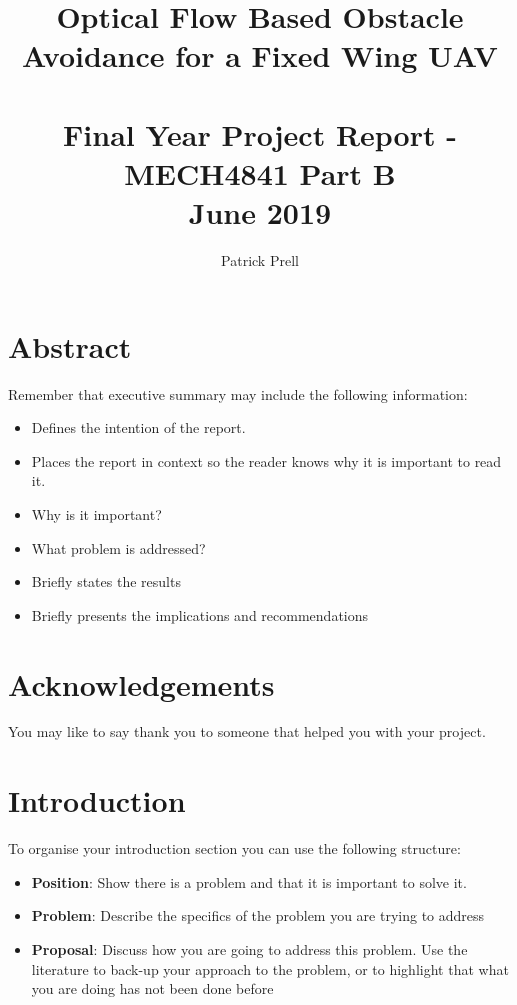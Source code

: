 \documentclass{UoNMCHA}
\numberwithin{equation}{section}
\begin{document}

\title{Optical Flow Based Obstacle Avoidance for a Fixed Wing UAV\\ \ \\
{\small Final Year Project Report - MECH4841 Part B  \\June 2019}}
\author[UoNMCHA]{Patrick Prell}
\address[UoNMCHA]{
Student of Mechatronics Engineering,\\
The University of Newcastle, Callaghan, NSW 2308, AUSTRALIA \\
Student Number: 3204734 \\
E-mail: \href{mailto:Patrick.Prell@uon.edu.au}{\textsf{Patrick.Prell@uon.edu.au}}}
\maketitle
\onecolumn

\vspace{-5mm}
\section*{Abstract}
\vspace{-3mm}
Remember that executive summary may include the following information:
\begin{itemize}
    \item Defines the intention of the report.
    \item Places the report in context so the reader knows why it is important to read it.
    \item Why is it important?
    \item What problem is addressed?
    \item Briefly states the results
    \item Briefly presents the implications and recommendations
\end{itemize}
\vspace{-2mm}
\section*{Acknowledgements}
\vspace{-3mm}
You may like to say thank you to someone that helped you with your project.
\newpage
\tableofcontents
\newpage
\section{Introduction}
To organise your introduction section you can use the following structure:
\begin{itemize}
    \item \textbf{Position}: Show there is a problem and that it is important to solve it.
    \item \textbf{Problem}: Describe the specifics of the problem you are trying to address
    \item \textbf{Proposal}: Discuss how you are going to address this problem. Use the literature to back-up your approach to the problem, or to highlight that what you are doing has not been done before
\end{itemize}
\end{document}
